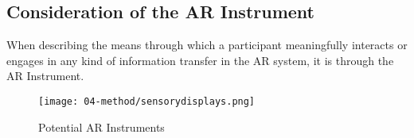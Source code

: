 \subsection{Consideration of the AR Instrument} \label{sec: method-patterns-instrument}
When describing the means through which a participant meaningfully interacts or engages in any kind of information transfer in the AR system, it is through the AR Instrument. 
\begin{figure}
    \centering
    {\texttt{[image: 04-method/sensorydisplays.png]}}
    \caption[Potential AR Instruments]{Potential AR Instruments}
\end{figure}\label{fig: ARinstrument}
